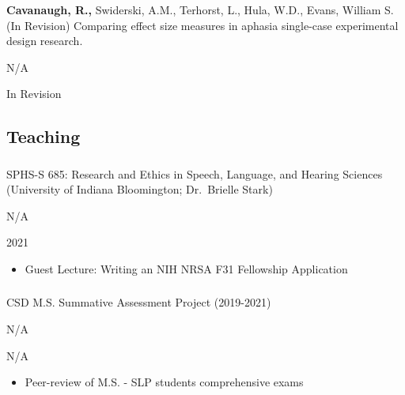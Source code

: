 \documentclass[
]{article}
\providecommand{\tightlist}{%
  \setlength{\itemsep}{0pt}\setlength{\parskip}{0pt}}
\begin{document}
\hypertarget{section-24}{%
\subsubsection{}\label{section-24}}

\textbf{Cavanaugh, R.,} Swiderski, A.M., Terhorst, L., Hula, W.D.,
Evans, William S. (In Revision) Comparing effect size measures in
aphasia single-case experimental design research.

N/A

In Revision

\hypertarget{teaching}{%
\subsection{Teaching}\label{teaching}}

\hypertarget{section-25}{%
\subsubsection{}\label{section-25}}

SPHS-S 685: Research and Ethics in Speech, Language, and Hearing
Sciences (University of Indiana Bloomington; Dr.~Brielle Stark)

N/A

2021

\begin{itemize}
\tightlist
\item
  Guest Lecture: Writing an NIH NRSA F31 Fellowship Application
\end{itemize}

\hypertarget{section-26}{%
\subsubsection{}\label{section-26}}

CSD M.S. Summative Assessment Project (2019-2021)

N/A

N/A

\begin{itemize}
\tightlist
\item
  Peer-review of M.S. - SLP students comprehensive exams
\end{itemize}

\hypertarget{section-27}{%
\subsubsection{}\label{section-27}}
\end{document}
